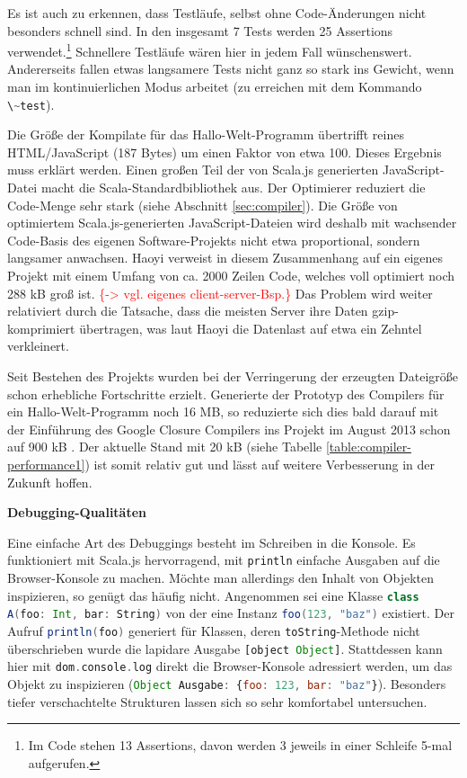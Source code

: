 \documentclass[a4paper, 12pt, hidelinks, listof=totoc, listoftables=totoc, bibliography=totoc]{scrreprt}
\newcommand{\code}[1]{\lstinline[language=Scala, style=inline]|#1|}
\newcommand{\scala}[1]{\lstinline[language=Scala, style=inline]|#1|}
\newcommand{\js}[1]{\lstinline[language=JavaScript, style=inline]|#1|}
\newcommand{\TODOi}[1]{\textcolor{red}{\{#1\}}}
\newcommand{\MyMiniSec}[1]{\rmfamily\fontsize{12}{15}\selectfont
	\vspace{7pt}\textbf{#1} %
}
\begin{document}
Es ist auch zu erkennen, dass Testläufe, selbst ohne Code-Änderungen nicht besonders schnell sind. In den insgesamt 7 Tests werden 25 Assertions verwendet.\footnote{Im Code stehen 13 Assertions, davon werden 3 jeweils in einer Schleife 5-mal aufgerufen.} Schnellere Testläufe wären hier in jedem Fall wünschenswert. Andererseits fallen etwas langsamere Tests nicht ganz so stark ins Gewicht, wenn man im kontinuierlichen Modus arbeitet (zu erreichen mit dem Kommando \code{\~test}).

Die Größe der Kompilate für das Hallo-Welt-Programm übertrifft reines \ac{HTML}/JavaScript (187 Bytes) um einen Faktor von etwa 100. Dieses Ergebnis muss erklärt werden. Einen großen Teil der von Scala.js generierten JavaScript-Datei macht die Scala-Standardbibliothek aus. Der Optimierer reduziert die Code-Menge sehr stark (siehe Abschnitt \ref{sec:compiler}). Die Größe von optimiertem Scala.js-generierten JavaScript-Dateien wird deshalb mit wachsender Code-Basis des eigenen Software-Projekts nicht etwa proportional, sondern langsamer anwachsen. Haoyi verweist in diesem Zusammenhang auf ein eigenes Projekt mit einem Umfang von ca. 2000 Zeilen Code, welches voll optimiert noch 288 kB groß ist. \TODOi{-> vgl. eigenes client-server-Bsp.} Das Problem wird weiter relativiert durch die Tatsache, dass die meisten Server ihre Daten gzip-komprimiert übertragen, was laut Haoyi die Datenlast auf etwa ein Zehntel verkleinert. \cite[\#BlobSize]{haoyi.HOS}

Seit Bestehen des Projekts wurden bei der Verringerung der erzeugten Dateigröße schon erhebliche Fortschritte erzielt. Generierte der Prototyp des Compilers für ein Hallo-Welt-Programm noch 16 MB, so reduzierte sich dies bald darauf mit der Einführung des Google Closure Compilers ins Projekt im August 2013 schon auf 900 kB \cite[Folie~5~f., Min.~6]{doeraene2014.WHB}. Der aktuelle Stand mit 20 kB (siehe Tabelle \ref{table:compiler-performance1}) ist somit relativ gut und lässt auf weitere Verbesserung in der Zukunft hoffen.


\MyMiniSec{Debugging-Qualitäten}

Eine einfache Art des Debuggings besteht im Schreiben in die Konsole. Es funktioniert mit Scala.js hervorragend, mit \scala{println} einfache Ausgaben auf die Browser-Konsole zu machen. Möchte man allerdings den Inhalt von Objekten inspizieren, so genügt das häufig nicht. Angenommen sei eine Klasse \scala{class A(foo: Int, bar: String)} von der eine Instanz \scala{foo(123, "baz")} existiert. Der Aufruf \scala{println(foo)} generiert für Klassen, deren \scala{toString}-Methode nicht überschrieben wurde die lapidare Ausgabe \js{[object Object]}. Stattdessen kann hier mit \scala{dom.console.log} direkt die Browser-Konsole adressiert werden, um das Objekt zu inspizieren (\js{Object Ausgabe: {foo: 123, bar: "baz"}}). Besonders tiefer verschachtelte Strukturen lassen sich so sehr komfortabel untersuchen.
\end{document}
